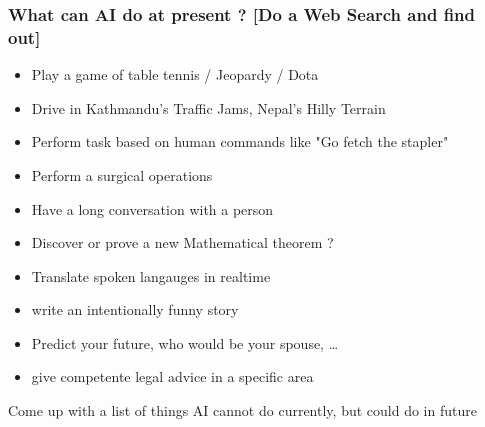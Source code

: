 \documentclass{beamer}
\begin{document}
\begin{frame}
  \frametitle{What can AI do at present ? [Do a Web Search and find out]}
  \begin{itemize}
    \item Play a game of table tennis / Jeopardy / Dota
    \item Drive in Kathmandu's Traffic Jams, Nepal's Hilly Terrain
    \item Perform task based on human commands like "Go fetch the stapler"
    \item Perform a surgical operations
    \item Have a long conversation with a person
    \item Discover or prove a new Mathematical theorem ?
    \item Translate spoken langauges in realtime
    \item write an intentionally funny story
    \item Predict your future, who would be your spouse, \dots
    \item give competente legal advice in a specific area
  \end{itemize}

  Come up with a list of things AI cannot do currently, but could do in future
\end{frame}

  
  
\end{document}
